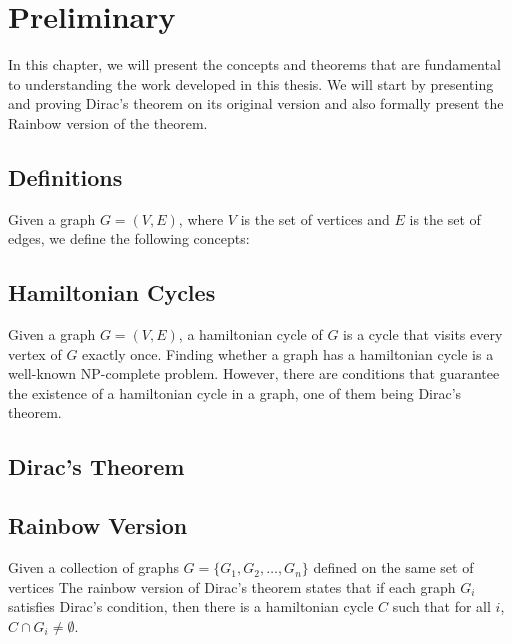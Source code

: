 
\chapter{Preliminary}

In this chapter, we will present the concepts and theorems that are fundamental to understanding the 
work developed in this thesis. We will start by presenting and proving Dirac's theorem on its original
version and also formally present the Rainbow version of the theorem.

\section{Definitions}

Given a graph $G = (V, E)$, where $V$ is the set of vertices and $E$ is the set of edges, we define the
following concepts:


\section{Hamiltonian Cycles}

Given a graph $G = (V, E)$, a hamiltonian cycle of $G$ is a cycle that visits every vertex of $G$ exactly once.
Finding whether a graph has a hamiltonian cycle is a well-known NP-complete problem. 
However, there are conditions that guarantee the existence of a hamiltonian cycle in a graph, one of them being Dirac's theorem.

\section{Dirac's Theorem}

\section{Rainbow Version}

Given a collection of graphs  $G = \{G_1, G_2, \ldots, G_n\}$ defined on the same set of vertices
The rainbow version of Dirac's theorem states that if each graph $G_i$ satisfies Dirac's condition, 
then there is a hamiltonian cycle $C$ such that for all $i$, $C \cap G_i \neq \emptyset$.
